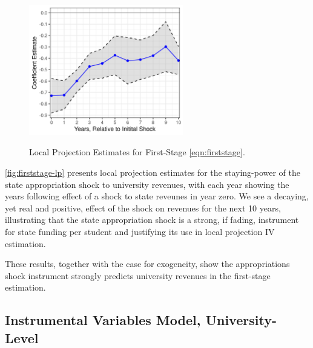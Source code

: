 \begin{figure}[h!]
    \centering
    \singlespacing
    \caption{Local Projection Estimates for First-Stage \autoref{eqn:firststage}.}
    \includegraphics[width=0.6\textwidth]{figures/firststage-lp.png}
    \label{fig:firststage-lp}
\end{figure}

\autoref{fig:firststage-lp} presents local projection estimates for the staying-power of the state appropriation shock to university revenues, with each year showing the years following effect of a shock to state reveunes in year zero.
We see a decaying, yet real and positive, effect of the shock on revenues for the next 10 years, illustrating that the state appropriation shock is a strong, if fading, instrument for state funding per student and justifying its use in local projection IV estimation.

These results, together with the case for exogeneity, show the appropriations shock instrument strongly predicts university revenues in the first-stage estimation.


\subsection{Instrumental Variables Model, University-Level}
\label{sec:iv-model-uni}

